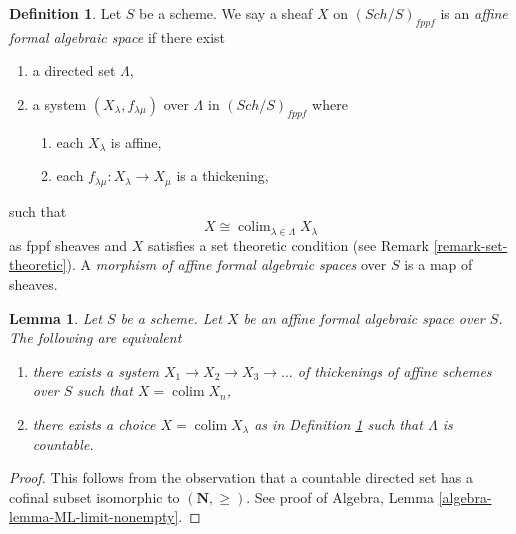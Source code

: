 \documentclass{stacks-project}
\theoremstyle{plain}
\newtheorem{lemma}[subsection]{Lemma}
\theoremstyle{definition}
\newtheorem{definition}[subsection]{Definition}
\theoremstyle{remark}
\numberwithin{equation}{subsection}
\def\colim{\mathop{\mathrm{colim}}\nolimits}
\def\Sch{\mathit{Sch}}
\begin{document}
\begin{definition}
\label{definition-affine-formal-algebraic-space}
Let $S$ be a scheme. We say a sheaf $X$ on $(\Sch/S)_{fppf}$ is an
{\it affine formal algebraic space} if there exist
\begin{enumerate}
\item a directed set $\Lambda$,
\item a system $(X_\lambda, f_{\lambda \mu})$ over $\Lambda$
in $(\Sch/S)_{fppf}$ where
\begin{enumerate}
\item each $X_\lambda$ is affine,
\item each $f_{\lambda \mu} : X_\lambda \to X_\mu$ is a thickening,
\end{enumerate}
\end{enumerate}
such that
$$
X \cong \colim_{\lambda \in \Lambda} X_\lambda
$$
as fppf sheaves and $X$ satisfies a set theoretic condition
(see Remark \ref{remark-set-theoretic}). A
{\it morphism of affine formal algebraic spaces}
over $S$ is a map of sheaves.
\end{definition}

\begin{lemma}
\label{lemma-countable-affine-formal-algebraic-space}
Let $S$ be a scheme. Let $X$ be an affine formal algebraic space over $S$.
The following are equivalent
\begin{enumerate}
\item there exists a system $X_1 \to X_2 \to X_3 \to \ldots$
of thickenings of affine schemes over $S$ such that $X = \colim X_n$,
\item there exists a choice $X = \colim X_\lambda$ as in
Definition \ref{definition-affine-formal-algebraic-space}
such that $\Lambda$ is countable.
\end{enumerate}
\end{lemma}

\begin{proof}
This follows from the observation that a countable directed set
has a cofinal subset isomorphic to $(\mathbf{N}, \geq)$.
See proof of Algebra, Lemma \ref{algebra-lemma-ML-limit-nonempty}.
\end{proof}
\end{document}
